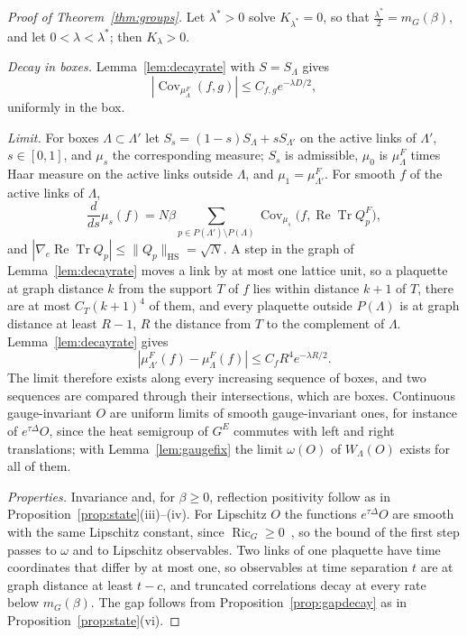 \documentclass[11pt]{amsart}
\theoremstyle{definition}
\theoremstyle{remark}
\numberwithin{equation}{section}
\newcommand{\ReTr}{\operatorname{Re}\operatorname{Tr}}
\newcommand{\Ric}{\operatorname{Ric}}
\newcommand{\Cov}{\operatorname{Cov}}
\begin{document}
\begin{proof}[Proof of Theorem~\ref{thm:groups}]
Let $\lambda^*>0$ solve $K_{\lambda^*}=0$, so that $\frac{\lambda^*}2=m_G(\beta)$, and
let $0<\lambda<\lambda^*$; then $K_\lambda>0$.

\emph{Decay in boxes.} Lemma~\ref{lem:decayrate} with $S=S_\Lambda$ gives
\[
|\Cov_{\mu^F_\Lambda}(f,g)|\le C_{f,g}e^{-\lambda D/2},
\]
uniformly in the box.

\emph{Limit.} For boxes $\Lambda\subset\Lambda'$ let $S_s=(1-s)S_\Lambda+sS_{\Lambda'}$
on the active links of $\Lambda'$, $s\in[0,1]$, and $\mu_s$ the corresponding
measure; $S_s$ is admissible, $\mu_0$ is $\mu^F_\Lambda$ times Haar measure on
the active links outside $\Lambda$, and $\mu_1=\mu^F_{\Lambda'}$. For smooth $f$
of the active links of $\Lambda$,
\[
\frac d{ds}\mu_s(f)=N\beta\sum_{p\in P(\Lambda')\setminus P(\Lambda)}
\Cov_{\mu_s}\bigl(f,\ReTr Q^F_p\bigr),
\]
and $|\nabla_e\ReTr Q_p|\le\|Q_p\|_{\mathrm{HS}}=\sqrt N$. A step in the graph
of Lemma~\ref{lem:decayrate} moves a link by at most one lattice unit, so a
plaquette at graph distance $k$ from the support $T$ of $f$ lies within
distance $k+1$ of $T$, there are at most $C_T(k+1)^4$ of them, and every
plaquette outside $P(\Lambda)$ is at graph distance at least $R-1$, $R$ the
distance from $T$ to the complement of $\Lambda$. Lemma~\ref{lem:decayrate}
gives
\[
|\mu^F_{\Lambda'}(f)-\mu^F_\Lambda(f)|\le C_fR^4e^{-\lambda R/2}.
\]
The limit therefore exists along every increasing sequence of boxes, and two
sequences are compared through their intersections, which are boxes.
Continuous gauge-invariant $O$ are uniform limits of smooth gauge-invariant
ones, for instance of $e^{\tau\Delta}O$, since the heat semigroup of $G^E$
commutes with left and right translations; with Lemma~\ref{lem:gaugefix}
the limit $\omega(O)$ of $W_\Lambda(O)$ exists for all of them.

\emph{Properties.} Invariance and, for $\beta\ge0$, reflection positivity
follow as in Proposition~\ref{prop:state}(iii)--(iv). For Lipschitz $O$ the
functions $e^{\tau\Delta}O$ are smooth with the same Lipschitz constant, since
$\Ric_G\ge0$~\cite[Sect.~3.3]{BGL14}, so the bound of the first step
passes to $\omega$ and to Lipschitz observables. Two links of one plaquette
have time coordinates that differ by at most one, so observables at time
separation $t$ are at graph distance at least $t-c$, and truncated
correlations decay at every rate below $m_G(\beta)$. The gap follows
from Proposition~\ref{prop:gapdecay} as in Proposition~\ref{prop:state}(vi).
\end{proof}
\end{document}
